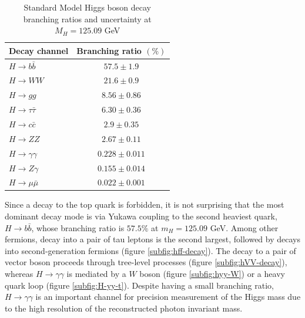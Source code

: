 \begin{table}[h]
    \centering
    \begin{tabular}{|l|c|}
    \hline \hline
     Decay channel    & Branching ratio $(\%)$ \\
     \hline
      $H\rightarrow b\bar{b}$   & $57.5\pm 1.9$ \\
      $H\rightarrow WW $   & $21.6\pm0.9$ \\
       $H\rightarrow gg$  & $8.56\pm0.86$ \\
        $H\rightarrow \tau\bar{\tau}$    & $6.30\pm 0.36$ \\
        $H\rightarrow c\bar{c}$    & $2.9\pm 0.35$ \\
        $H\rightarrow ZZ$    & $2.67\pm 0.11$ \\
        $H\rightarrow \gamma\gamma$    & $0.228\pm 0.011$ \\
        $H\rightarrow Z\gamma$    & $0.155\pm 0.014$ \\
        $H\rightarrow \mu\bar{\mu}$    & $0.022\pm 0.001$ \\
    \hline
    \end{tabular}
    \caption{Standard Model Higgs boson decay branching ratios and uncertainty at $M_H=125.09$ GeV}
    \label{tab:higgs-br}
\end{table}

Since a decay to the top quark is forbidden, it is not surprising that the most dominant decay mode is via Yukawa coupling to the second heaviest quark, $H\rightarrow b\bar{b}$, whose branching ratio is $57.5\%$ at $m_H=125.09$ GeV. 
Among other fermions, decay into a pair of tau leptons is the second largest, followed by decays into second-generation fermions (figure \ref{subfig:hff-decay}). 
The decay to a pair of vector boson proceeds through tree-level processes (figure \ref{subfig:hVV-decay}), whereas $H\rightarrow \gamma\gamma$ is mediated by a $W$ boson (figure \ref{subfig:hyy-W}) or a heavy quark loop (figure \ref{subfig:H-yy-t}). Despite having a small branching ratio, $H\rightarrow \gamma\gamma$ is an important channel for precision measurement of the Higgs mass due to the high resolution of the reconstructed photon invariant mass. 

